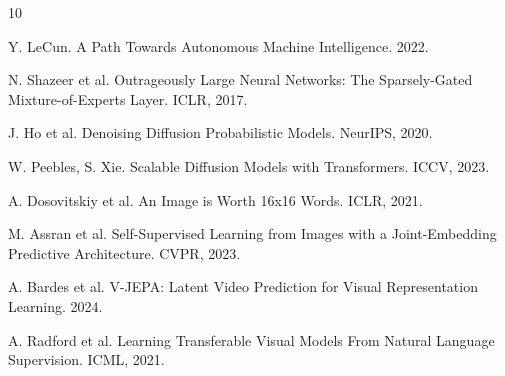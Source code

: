 \documentclass[11pt,twocolumn]{article}
\begin{document}

\begin{thebibliography}{10}

Y. LeCun. A Path Towards Autonomous Machine Intelligence. 2022.

N. Shazeer et al. Outrageously Large Neural Networks: The Sparsely-Gated Mixture-of-Experts Layer. ICLR, 2017.

J. Ho et al. Denoising Diffusion Probabilistic Models. NeurIPS, 2020.

W. Peebles, S. Xie. Scalable Diffusion Models with Transformers. ICCV, 2023.

A. Dosovitskiy et al. An Image is Worth 16x16 Words. ICLR, 2021.

M. Assran et al. Self-Supervised Learning from Images with a Joint-Embedding Predictive Architecture. CVPR, 2023.

A. Bardes et al. V-JEPA: Latent Video Prediction for Visual Representation Learning. 2024.

A. Radford et al. Learning Transferable Visual Models From Natural Language Supervision. ICML, 2021.

\end{thebibliography}
\end{document}
